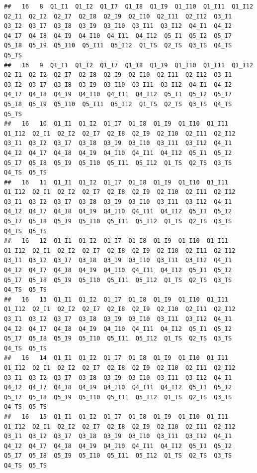 \documentclass[
]{book}
\begin{document}
\begin{verbatim}
##   16   8  Q1_I1  Q1_I2  Q1_I7  Q1_I8  Q1_I9  Q1_I10  Q1_I11  Q1_I12  Q2_I1  Q2_I2  Q2_I7  Q2_I8  Q2_I9  Q2_I10  Q2_I11  Q2_I12  Q3_I1  Q3_I2  Q3_I7  Q3_I8  Q3_I9  Q3_I10  Q3_I11  Q3_I12  Q4_I1  Q4_I2  Q4_I7  Q4_I8  Q4_I9  Q4_I10  Q4_I11  Q4_I12  Q5_I1  Q5_I2  Q5_I7  Q5_I8  Q5_I9  Q5_I10  Q5_I11  Q5_I12  Q1_TS  Q2_TS  Q3_TS  Q4_TS  Q5_TS
##   16   9  Q1_I1  Q1_I2  Q1_I7  Q1_I8  Q1_I9  Q1_I10  Q1_I11  Q1_I12  Q2_I1  Q2_I2  Q2_I7  Q2_I8  Q2_I9  Q2_I10  Q2_I11  Q2_I12  Q3_I1  Q3_I2  Q3_I7  Q3_I8  Q3_I9  Q3_I10  Q3_I11  Q3_I12  Q4_I1  Q4_I2  Q4_I7  Q4_I8  Q4_I9  Q4_I10  Q4_I11  Q4_I12  Q5_I1  Q5_I2  Q5_I7  Q5_I8  Q5_I9  Q5_I10  Q5_I11  Q5_I12  Q1_TS  Q2_TS  Q3_TS  Q4_TS  Q5_TS
##   16   10  Q1_I1  Q1_I2  Q1_I7  Q1_I8  Q1_I9  Q1_I10  Q1_I11  Q1_I12  Q2_I1  Q2_I2  Q2_I7  Q2_I8  Q2_I9  Q2_I10  Q2_I11  Q2_I12  Q3_I1  Q3_I2  Q3_I7  Q3_I8  Q3_I9  Q3_I10  Q3_I11  Q3_I12  Q4_I1  Q4_I2  Q4_I7  Q4_I8  Q4_I9  Q4_I10  Q4_I11  Q4_I12  Q5_I1  Q5_I2  Q5_I7  Q5_I8  Q5_I9  Q5_I10  Q5_I11  Q5_I12  Q1_TS  Q2_TS  Q3_TS  Q4_TS  Q5_TS
##   16   11  Q1_I1  Q1_I2  Q1_I7  Q1_I8  Q1_I9  Q1_I10  Q1_I11  Q1_I12  Q2_I1  Q2_I2  Q2_I7  Q2_I8  Q2_I9  Q2_I10  Q2_I11  Q2_I12  Q3_I1  Q3_I2  Q3_I7  Q3_I8  Q3_I9  Q3_I10  Q3_I11  Q3_I12  Q4_I1  Q4_I2  Q4_I7  Q4_I8  Q4_I9  Q4_I10  Q4_I11  Q4_I12  Q5_I1  Q5_I2  Q5_I7  Q5_I8  Q5_I9  Q5_I10  Q5_I11  Q5_I12  Q1_TS  Q2_TS  Q3_TS  Q4_TS  Q5_TS
##   16   12  Q1_I1  Q1_I2  Q1_I7  Q1_I8  Q1_I9  Q1_I10  Q1_I11  Q1_I12  Q2_I1  Q2_I2  Q2_I7  Q2_I8  Q2_I9  Q2_I10  Q2_I11  Q2_I12  Q3_I1  Q3_I2  Q3_I7  Q3_I8  Q3_I9  Q3_I10  Q3_I11  Q3_I12  Q4_I1  Q4_I2  Q4_I7  Q4_I8  Q4_I9  Q4_I10  Q4_I11  Q4_I12  Q5_I1  Q5_I2  Q5_I7  Q5_I8  Q5_I9  Q5_I10  Q5_I11  Q5_I12  Q1_TS  Q2_TS  Q3_TS  Q4_TS  Q5_TS
##   16   13  Q1_I1  Q1_I2  Q1_I7  Q1_I8  Q1_I9  Q1_I10  Q1_I11  Q1_I12  Q2_I1  Q2_I2  Q2_I7  Q2_I8  Q2_I9  Q2_I10  Q2_I11  Q2_I12  Q3_I1  Q3_I2  Q3_I7  Q3_I8  Q3_I9  Q3_I10  Q3_I11  Q3_I12  Q4_I1  Q4_I2  Q4_I7  Q4_I8  Q4_I9  Q4_I10  Q4_I11  Q4_I12  Q5_I1  Q5_I2  Q5_I7  Q5_I8  Q5_I9  Q5_I10  Q5_I11  Q5_I12  Q1_TS  Q2_TS  Q3_TS  Q4_TS  Q5_TS
##   16   14  Q1_I1  Q1_I2  Q1_I7  Q1_I8  Q1_I9  Q1_I10  Q1_I11  Q1_I12  Q2_I1  Q2_I2  Q2_I7  Q2_I8  Q2_I9  Q2_I10  Q2_I11  Q2_I12  Q3_I1  Q3_I2  Q3_I7  Q3_I8  Q3_I9  Q3_I10  Q3_I11  Q3_I12  Q4_I1  Q4_I2  Q4_I7  Q4_I8  Q4_I9  Q4_I10  Q4_I11  Q4_I12  Q5_I1  Q5_I2  Q5_I7  Q5_I8  Q5_I9  Q5_I10  Q5_I11  Q5_I12  Q1_TS  Q2_TS  Q3_TS  Q4_TS  Q5_TS
##   16   15  Q1_I1  Q1_I2  Q1_I7  Q1_I8  Q1_I9  Q1_I10  Q1_I11  Q1_I12  Q2_I1  Q2_I2  Q2_I7  Q2_I8  Q2_I9  Q2_I10  Q2_I11  Q2_I12  Q3_I1  Q3_I2  Q3_I7  Q3_I8  Q3_I9  Q3_I10  Q3_I11  Q3_I12  Q4_I1  Q4_I2  Q4_I7  Q4_I8  Q4_I9  Q4_I10  Q4_I11  Q4_I12  Q5_I1  Q5_I2  Q5_I7  Q5_I8  Q5_I9  Q5_I10  Q5_I11  Q5_I12  Q1_TS  Q2_TS  Q3_TS  Q4_TS  Q5_TS

\end{verbatim}
\end{document}
